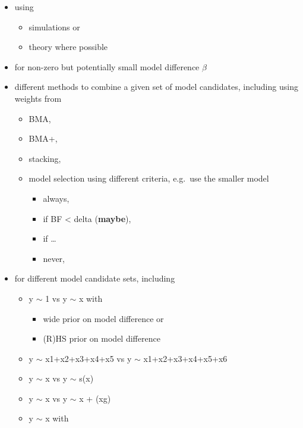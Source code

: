 \begin{itemize}
\tightlist
\item
  using

  \begin{itemize}
  \tightlist
  \item
    simulations or
  \item
    theory where possible
  \end{itemize}
\item
  for non-zero but potentially small model difference \(\beta\)
\item
  different methods to combine a given set of model candidates,
  including using weights from

  \begin{itemize}
  \tightlist
  \item
    BMA,
  \item
    BMA+,
  \item
    stacking,
  \item
    model selection using different criteria, e.g.~use the smaller model

    \begin{itemize}
    \tightlist
    \item
      always,
    \item
      if BF \textless{} delta (\textbf{maybe}),
    \item
      if \ldots{}
    \item
      never,
    \end{itemize}
  \end{itemize}
\item
  for different model candidate sets, including

  \begin{itemize}
  \tightlist
  \item
    y \(\sim\) 1 vs y \(\sim\) x with

    \begin{itemize}
    \tightlist
    \item
      wide prior on model difference or
    \item
      (R)HS prior on model difference
    \end{itemize}
  \item
    y \(\sim\) x1+x2+x3+x4+x5 vs y \(\sim\) x1+x2+x3+x4+x5+x6
  \item
    y \(\sim\) x vs y \(\sim\) s(x)
  \item
    y \(\sim\) x vs y \(\sim\) x + (x\textbar{}g)
  \item
    y \(\sim\) x with


\end{itemize}
\end{itemize}
